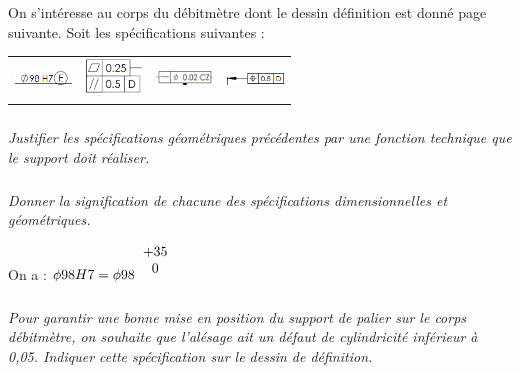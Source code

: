 \documentclass[10pt,fleqn]{article} %
\begin{document}
\begin{multicols}{2}
On s'intéresse au corps du débitmètre dont le dessin définition est donné page suivante. 
Soit les spécifications suivantes : 
\begin{center}
\begin{tabular}{cccc}
\includegraphics[width=1.5cm]{images/debitmetre_05_a} &
\includegraphics[width=1.5cm]{images/debitmetre_05_b} &
\includegraphics[width=1.5cm]{images/debitmetre_05_c} &
\includegraphics[width=1.5cm]{images/debitmetre_05_d} \\
\end{tabular}
\end{center}

\subparagraph{}\textit{Justifier les spécifications géométriques précédentes par une fonction technique que le support doit réaliser. }

\subparagraph{}\textit{Donner la signification de chacune des spécifications dimensionnelles et géométriques.}
\begin{rem}
On a : $\phi 98 H7 = \phi 98 ^{\begin{tabular}{c}+35 \\ 0\end{tabular}}$
\end{rem}

\subparagraph{}\textit{Pour garantir une bonne mise en position du support de palier sur le corps débitmètre, on souhaite que l'alésage ait un défaut de cylindricité inférieur à 0,05. Indiquer cette spécification sur le dessin de définition.}
\end{multicols}
\end{document}
